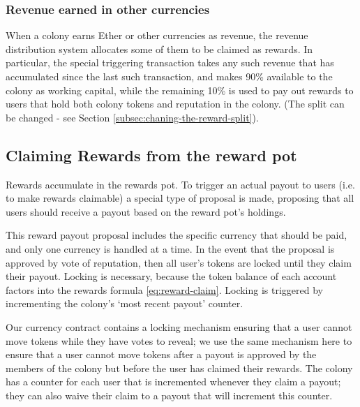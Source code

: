 \subsubsection*{Revenue earned in other currencies}
When a colony earns Ether or other currencies as revenue, the revenue distribution system allocates some of them to be claimed as rewards. In particular, the special triggering transaction takes any such revenue that has accumulated since the last such transaction, and makes 90\% available to the colony as working capital, while the remaining 10\% is used to pay out rewards to users that hold both colony tokens and reputation in the colony. (The split can be changed - see Section \ref{subsec:chaning-the-reward-split}).

\begin{center}
\end{center}

\subsection{Claiming Rewards from the reward pot}\label{sec:claimrewards}
Rewards accumulate in the rewards pot. To trigger an actual payout to users (i.e. to make rewards claimable) a special type of proposal is made, proposing that all users should receive a payout based on the reward pot's holdings. 

This reward payout proposal includes the specific currency that should be paid, and only one currency is handled at a time. In the event that the proposal is approved by vote of reputation, then all user's tokens are locked until they claim their payout. Locking is necessary, because the token balance of each account factors into the rewards formula \eqref{eq:reward-claim}. Locking is triggered by incrementing the colony's `most recent payout' counter. 

Our currency contract contains a locking mechanism ensuring that a user cannot move tokens while they have votes to reveal; we use the same mechanism here to ensure that a user cannot move tokens after a payout is approved by the members of the colony but before the user has claimed their rewards. The colony has a counter for each user that is incremented whenever they claim a payout; they can also waive their claim to a payout that will increment this counter.  

